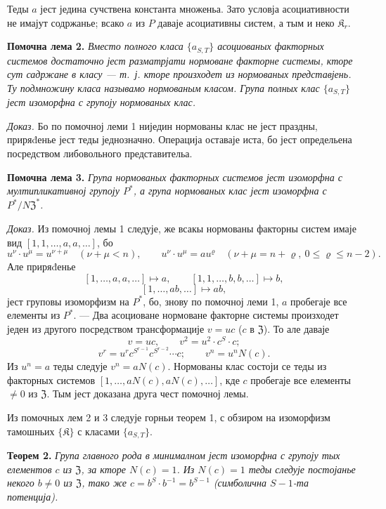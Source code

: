 \documentclass[11pt]{article}
\begin{document}
Теды \(a\) јест једина сучствена константа множеньа. Зато условја асоциативности не имајут содржанье; всако \(a\) из \(P\) даваје асоциативны систем, а тым и неко \(\mathfrak K_r\).

\noindent\textbf{Помочна лема 2.} \emph{Вместо полного класа \(\{a_{S,T}\}\) асоциованых факторных системов достаточно јест разматрјати нормоване факторне системы, кторе сут садржане в класу --- т.~ј. кторе произходет из нормованых представјень. Ту подмножину класа называмо нормованым класом. Група полных клас \(\{a_{S,T}\}\) јест изоморфна с групоју нормованых клас.}

\noindent\emph{Доказ.} Бо по помочној леми 1 ниједин нормованы клас не јест праздны, приряđенье јест теды једнозначно. Операција оставаје иста, бо јест определьена посредством либовольного представительа.

\noindent\textbf{Помочна лема 3.} \emph{Група нормованых факторных системов јест изоморфна с мултипликативној групоју \(P^*\), а група нормованых клас јест изоморфна с \(P^*/N\mathfrak Z^*\).}

\noindent\emph{Доказ.} Из помочној лемы 1 следује, же всакы нормованы факторны систем имаје вид \([1,1,\ldots,a,a,\ldots]\), бо
\[
u^\nu\cdot u^\mu=u^{\nu+\mu}\quad(\nu+\mu<n),
\qquad
u^\nu\cdot u^\mu=au^\varrho\quad(\nu+\mu=n+\varrho,\ 0\leq\varrho\leq n-2).
\]
Але приряđенье
\[
[1,\ldots,a,a,\ldots]\mapsto a,
\qquad
[1,1,\ldots,b,b,\ldots]\mapsto b,
\]
\[
[1,\ldots,ab,\ldots]\mapsto ab,
\]
јест груповы изоморфизм на \(P^*\), бо, знову по помочној леми 1, \(a\) пробегаје все елементы из \(P^*\). --- Два асоциоване нормоване факторне системы произходет једен из другого посредством трансформације \(v=uc\) (\(c\) в \(\mathfrak Z\)). То але даваје
\[
v=uc,\qquad v^2=u^2\cdot c^S\cdot c;
\]
\[
v^r=u^r c^{S^{r-1}}c^{S^{r-2}}\cdots c;
\qquad
v^n=u^nN(c).
\]
Из \(u^n=a\) теды следује \(v^n=aN(c)\). Нормованы клас состоји се теды из факторных системов \([1,\ldots,aN(c),aN(c),\ldots]\), кде \(c\) пробегаје все елементы \(\neq0\) из \(\mathfrak Z\). Тым јест доказана друга чест помочној лемы.

Из помочных лем 2 и 3 следује горньи теорем 1, с обзиром на изоморфизм тамошньих \(\{\mathfrak K\}\) с класами \(\{a_{S,T}\}\).

\noindent\textbf{Теорем 2.} \emph{Група главного рода в минималном јест изоморфна с групоју тых елементов \(c\) из \(\mathfrak Z\), за кторе \(N(c)=1\). Из \(N(c)=1\) теды следује постојанье некого \(b\neq0\) из \(\mathfrak Z\), тако же \(c=b^S\cdot b^{-1}=b^{S-1}\) (симболична \(S-1\)-та потенција).}
\end{document}
